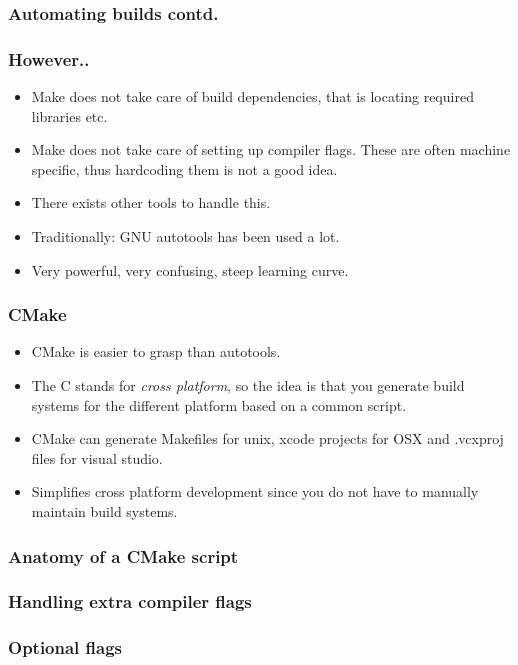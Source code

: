 \documentclass{beamer}
\begin{document}
\begin{frame}\frametitle{Automating builds contd.}
  
\end{frame}

\begin{frame}\frametitle{However..}
  \begin{itemize}
    \item Make does not take care of build dependencies, that is locating required libraries etc.
    \item Make does not take care of setting up compiler flags. These are often machine specific, thus 
          hardcoding them is not a good idea.
    \item There exists other tools to handle this.
    \item Traditionally: GNU autotools has been used a lot.
    \item Very powerful, very confusing, steep learning curve.
  \end{itemize}
\end{frame}

\begin{frame}\frametitle{CMake}
  \begin{itemize}
    \item CMake is easier to grasp than autotools.
    \item The C stands for \emph{cross platform}, so the idea is that
          you generate build systems for the different platform based on a common script.
    \item CMake can generate Makefiles for unix, xcode projects for OSX and 
           .vcxproj files for visual studio.
    \item Simplifies cross platform development since you do not have to manually maintain build systems.
  \end{itemize}
\end{frame}

\begin{frame}\frametitle{Anatomy of a CMake script}

\end{frame}

\begin{frame}\frametitle{Handling extra compiler flags}

\end{frame}

\begin{frame}\frametitle{Optional flags}

\end{frame}
\end{document}
